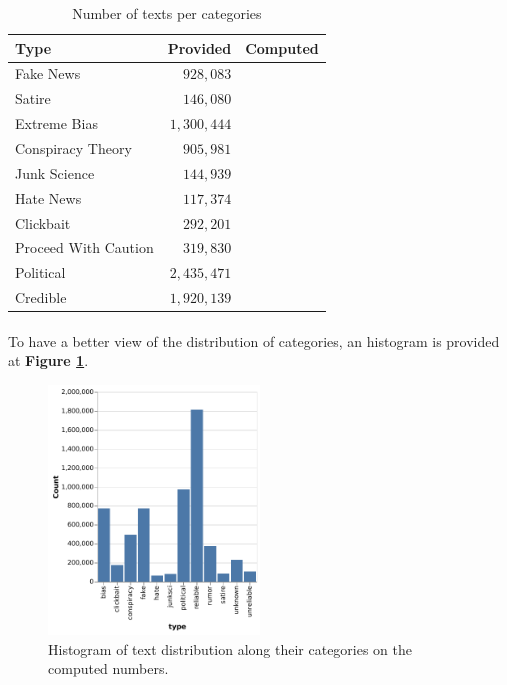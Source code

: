 \begin{table}[h]
\centering
	\begin{tabular}{l|r|r}
  Type & Provided & Computed\\
  \hline
  Fake News & $928,083$ & \\
  Satire & $146,080$ & \\
  Extreme Bias & $1,300,444$ & \\
  Conspiracy Theory & $905,981$ & \\
  Junk Science & $144,939$ & \\
  Hate News & $117,374$ & \\
  Clickbait & $292,201$ & \\
  Proceed With Caution & $319,830$ & \\
  Political & $2,435,471$ & \\
  Credible & $1,920,139$ & \\
  \hline
\end{tabular}
  \caption{Number of texts per categories}
  \label{tab:explo:count1}
\end{table}

\paragraph{} To have a better view of the distribution of categories, an histogram is provided at \textbf{Figure \ref{fig:chap1:hist1}}.

\begin{figure}[h]
	\centering
	\includegraphics[width=0.5\textwidth]{chapter/images/data_exploration/plot1}
	\caption{Histogram of text distribution along their categories on the computed numbers. }
	\label{fig:chap1:hist1}
\end{figure}
